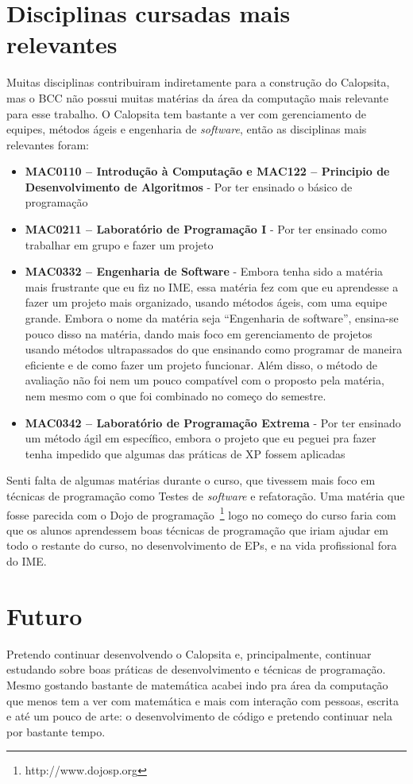 \documentclass[titlepage,a4paper]{article}
\newcommand{\software}{\textit{software}}
\newcommand{\calopsita}{Calopsita}
\begin{document}
\section{Disciplinas cursadas mais relevantes}

Muitas disciplinas contribuiram indiretamente para a construção do \calopsita{}, mas o BCC não possui muitas matérias da área da computação mais relevante para esse trabalho. O \calopsita{} tem bastante a ver com gerenciamento de equipes, métodos ágeis e engenharia de \software{}, então as disciplinas mais relevantes foram:

\begin{itemize}
	\item{\textbf{MAC0110 -- Introdução à Computação e MAC122 -- Principio de Desenvolvimento de Algoritmos} - Por ter ensinado o básico de programação}
	\item{\textbf{MAC0211 -- Laboratório de Programação I} - Por ter ensinado como trabalhar em grupo e fazer um projeto}
	\item{\textbf{MAC0332 -- Engenharia de Software} - Embora tenha sido a matéria mais frustrante que eu fiz no IME, essa matéria fez com que eu aprendesse a fazer um projeto mais organizado, usando métodos ágeis, com uma equipe grande. Embora o nome da matéria seja ``Engenharia de software'', ensina-se pouco disso na matéria, dando mais foco em gerenciamento de projetos usando métodos ultrapassados do que ensinando como programar de maneira eficiente e de como fazer um projeto funcionar. Além disso, o método de avaliação não foi nem um pouco compatível com o proposto pela matéria, nem mesmo com o que foi combinado no começo do semestre.}
	\item{\textbf{MAC0342 -- Laboratório de Programação Extrema } - Por ter ensinado um método ágil em específico, embora o projeto que eu peguei pra fazer tenha impedido que algumas das práticas de XP fossem aplicadas}
\end{itemize}

Senti falta de algumas matérias durante o curso, que tivessem mais foco em técnicas de programação como Testes de \software{} e refatoração. Uma matéria que fosse parecida com o Dojo de programação~\footnote{http://www.dojosp.org} logo no começo do curso faria com que os alunos aprendessem boas técnicas de programação que iriam ajudar em todo o restante do curso, no desenvolvimento de EPs, e na vida profissional fora do IME.

\section{Futuro}

Pretendo continuar desenvolvendo o \calopsita{} e, principalmente, continuar estudando sobre boas práticas de desenvolvimento e técnicas de programação. Mesmo gostando bastante de matemática acabei indo pra área da computação que menos tem a ver com matemática e mais com interação com pessoas, escrita e até um pouco de arte: o desenvolvimento de código e pretendo continuar nela por bastante tempo.
\end{document}
